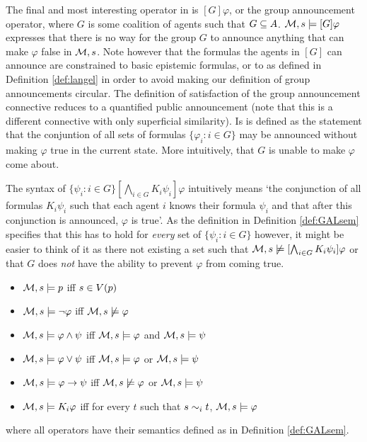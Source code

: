 The final and most interesting operator in  is $[G]\varphi$, or the group announcement operator, where $G$ is some coalition of agents such that $G \subseteq A$. $\mathcal{M},s \models [G]\varphi$ expresses that there is no way for the group $G$ to announce anything that can make $\varphi$ false in $\mathcal{M},s$. Note however that the formulas the agents in $[G]$ can announce are constrained to basic epistemic formulas, or to  as defined in Definition \ref{def:langel} in order to avoid making our definition of group announcements circular. The definition of satisfaction of the group announcement connective reduces to a quantified public announcement (note that this is a different connective with only superficial similarity). Is is defined as the statement that the conjuntion of all sets of formulas $\{\varphi_i:i\in G\}$ may be announced without making $\varphi$ true in the current state. More intuitively, that $G$ is unable to make $\varphi$ come about.

The syntax of $\{\psi_i: i\in G\}[\bigwedge_{i\in G}K_i\psi_i]\varphi$ intuitively means `the conjunction of all formulas $K_i\psi_i$ such that each agent $i$ knows their formula $\psi_i$ and that after this conjunction is announced, $\varphi$ is true'. As the definition in Definition \ref{def:GALsem} specifies that this has to hold for \textit{every} set of $\{\psi_i : i\in G\}$ however, it might be easier to think of it as there not existing a set such that $\mathcal{M},s \not\models [\bigwedge_{i\in G}K_i\psi_i]\varphi$ or that $G$ does \textit{not} have the ability to prevent $\varphi$ from coming true.

\begin{definition} \hfill
	\label{def:langel}
	\begin{itemize}
		\item[] $\mathcal{M},s \models p $ iff $ s \in V(p)$
		\item[] $\mathcal{M},s \models \neg\varphi$ iff $ \mathcal{M},s \not\models \varphi$
		\item[] $\mathcal{M},s \models \varphi \wedge \psi $ iff $ \mathcal{M},s \models \varphi $ and $ \mathcal{M},s \models \psi$
		\item[] $\mathcal{M},s \models \varphi \vee \psi $ iff $ \mathcal{M},s \models \varphi $ or $ \mathcal{M},s \models \psi$
		\item[] $\mathcal{M},s \models \varphi \rightarrow \psi $ iff $ \mathcal{M},s \not\models \varphi $ or $ \mathcal{M},s \models \psi$
		\item[] $\mathcal{M},s \models K_i\varphi $ iff for every $t$ such that $s\sim_{i}t$, $\mathcal{M},s \models \varphi$
	\end{itemize}
	where all operators have their semantics defined as in Definition \ref{def:GALsem}.
\end{definition}

